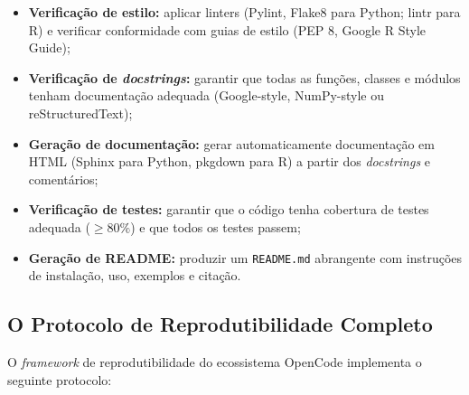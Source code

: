 \begin{itemize}
    \item \textbf{Verificação de estilo:} aplicar linters (Pylint,
    Flake8 para Python; lintr para R) e verificar conformidade com
    guias de estilo (PEP 8, Google R Style Guide);

    \item \textbf{Verificação de \textit{docstrings}:} garantir que
    todas as funções, classes e módulos tenham documentação
    adequada (Google-style, NumPy-style ou reStructuredText);

    \item \textbf{Geração de documentação:} gerar automaticamente
    documentação em HTML (Sphinx para Python, pkgdown para R) a
    partir dos \textit{docstrings} e comentários;

    \item \textbf{Verificação de testes:} garantir que o código
    tenha cobertura de testes adequada ($\geq 80\%$) e que todos os
    testes passem;

    \item \textbf{Geração de README:} produzir um
    \texttt{README.md} abrangente com instruções de instalação, uso,
    exemplos e citação.
\end{itemize}

\subsection{O Protocolo de Reprodutibilidade Completo}
\label{sec:protocolo_reprodutibilidade}

O \textit{framework} de reprodutibilidade do ecossistema OpenCode
implementa o seguinte protocolo:

